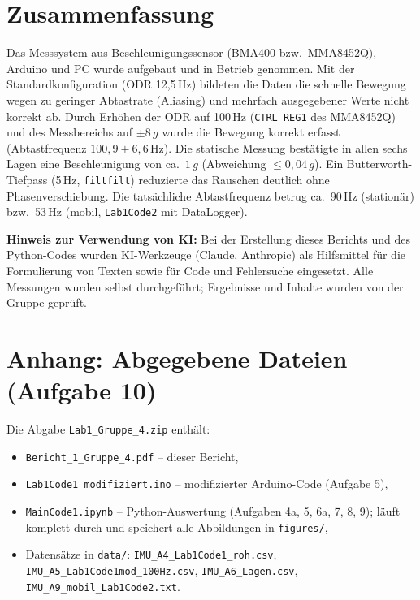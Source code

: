 \documentclass[a4paper,oneside,10pt]{article}
\begin{document}
\section{Zusammenfassung}
Das Messsystem aus Beschleunigungssensor (BMA400 bzw.\ MMA8452Q), Arduino und PC
wurde aufgebaut und in Betrieb genommen. Mit der Standardkonfiguration (ODR
12{,}5\,Hz) bildeten die Daten die schnelle Bewegung wegen zu geringer Abtastrate
(Aliasing) und mehrfach ausgegebener Werte nicht korrekt ab. Durch Erhöhen der ODR
auf 100\,Hz (\texttt{CTRL\_REG1} des MMA8452Q) und des Messbereichs auf $\pm 8\,g$
wurde die Bewegung korrekt erfasst (Abtastfrequenz $100{,}9 \pm 6{,}6$\,Hz). Die statische Messung
bestätigte in allen sechs Lagen eine Beschleunigung von ca.\ $1\,g$ (Abweichung
$\leq 0{,}04\,g$). Ein Butterworth-Tiefpass (5\,Hz, \texttt{filtfilt}) reduzierte das
Rauschen deutlich ohne Phasenverschiebung. Die tatsächliche Abtastfrequenz betrug
ca.\ 90\,Hz (stationär) bzw.\ 53\,Hz (mobil, \texttt{Lab1Code2} mit DataLogger).




\textbf{Hinweis zur Verwendung von KI:} Bei der Erstellung dieses Berichts und des
Python-Codes wurden KI-Werkzeuge (Claude, Anthropic) als Hilfsmittel für die
Formulierung von Texten sowie für Code und Fehlersuche eingesetzt. Alle Messungen
wurden selbst durchgeführt; Ergebnisse und Inhalte wurden von der Gruppe geprüft.

\appendix
\section{Anhang: Abgegebene Dateien (Aufgabe 10)}
\label{sec:anhang}
Die Abgabe \texttt{Lab1\_Gruppe\_4.zip} enthält:
\begin{itemize}
  \item \texttt{Bericht\_1\_Gruppe\_4.pdf} -- dieser Bericht,
  \item \texttt{Lab1Code1\_modifiziert.ino} -- modifizierter Arduino-Code (Aufgabe 5),
  \item \texttt{MainCode1.ipynb} -- Python-Auswertung (Aufgaben 4a, 5, 6a, 7, 8, 9); läuft komplett durch und speichert alle Abbildungen in \texttt{figures/},
  \item Datensätze in \texttt{data/}: \texttt{IMU\_A4\_Lab1Code1\_roh.csv}, \texttt{IMU\_A5\_Lab1Code1mod\_100Hz.csv}, \texttt{IMU\_A6\_Lagen.csv}, \texttt{IMU\_A9\_mobil\_Lab1Code2.txt}.
\end{itemize}
\end{document}
